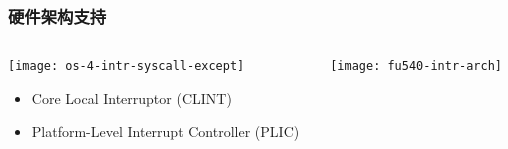
\begin{frame}[plain]
	\frametitle{硬件架构支持}
	\begin{columns}
		
		\begin{column}{0.4\textwidth}
			\centering
			\texttt{[image: os-4-intr-syscall-except]}
			\begin{itemize} \small
				\item Core Local	Interruptor (CLINT)
				\item Platform-Level Interrupt Controller (PLIC)
			\end{itemize}
			
		\end{column}
		
		\begin{column}{0.6\textwidth}
			
			\centering
			\texttt{[image: fu540-intr-arch]}	
			
			
		\end{column}
		
	\end{columns}
	
\end{frame}


